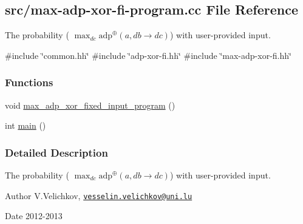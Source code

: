 \hypertarget{max-adp-xor-fi-program_8cc}{\subsection{src/max-\/adp-\/xor-\/fi-\/program.cc \-File \-Reference}
\label{max-adp-xor-fi-program_8cc}
}


\-The probability ( $\max_{dc} \mathrm{adp}^{\oplus}(a, db \rightarrow dc)$) with user-\/provided input.  


{\ttfamily \#include \char`\"{}common.\-hh\char`\"{}}\*
{\ttfamily \#include \char`\"{}adp-\/xor-\/fi.\-hh\char`\"{}}\*
{\ttfamily \#include \char`\"{}max-\/adp-\/xor-\/fi.\-hh\char`\"{}}\*
\subsubsection*{\-Functions}
\begin{DoxyCompactItemize}
\item 
void \hyperlink{max-adp-xor-fi-program_8cc_a4ec100a06d64a51308427cab4fdeee8f}{max\-\_\-adp\-\_\-xor\-\_\-fixed\-\_\-input\-\_\-program} ()
\item 
int \hyperlink{max-adp-xor-fi-program_8cc_ae66f6b31b5ad750f1fe042a706a4e3d4}{main} ()
\end{DoxyCompactItemize}


\subsubsection{\-Detailed \-Description}
\-The probability ( $\max_{dc} \mathrm{adp}^{\oplus}(a, db \rightarrow dc)$) with user-\/provided input. \begin{DoxyAuthor}{\-Author}
\-V.\-Velichkov, \href{mailto:vesselin.velichkov@uni.lu}{\tt vesselin.\-velichkov@uni.\-lu} 
\end{DoxyAuthor}
\begin{DoxyDate}{\-Date}
2012-\/2013 
\end{DoxyDate}


